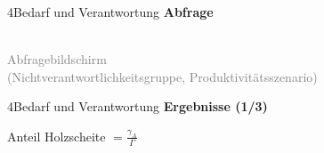 \documentclass[xcolor=table,9pt,aspectratio=169]{beamer}
\begin{document}
\begin{frame}{\vspace*{10mm}4\hspace*{1em}Bedarf und Verantwortung}
\textbf{Abfrage}\\
\medskip
\begin{center}
   \\
   \textcolor{gray}{Abfragebildschirm\\(Nichtverantwortlichkeitsgruppe, Produktivitätsszenario)}
\end{center}
\end{frame}


\begin{frame}{\vspace*{10mm}4\hspace*{1em}Bedarf und Verantwortung}
\textbf{Ergebnisse (1/3)}\\
\medskip
\begin{center}
   Anteil Holzscheite $=\frac{\gamma_{A}}{\Gamma}$
\end{center}
\end{frame}
\end{document}
